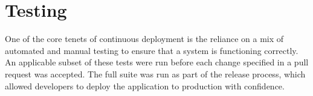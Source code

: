 \chapter{Testing}
\par
One of the core tenets of continuous deployment is the reliance on a mix of automated and manual testing to ensure that a system is functioning correctly. An applicable subset of these tests were run before each change specified in a pull request was accepted. The full suite was run as part of the release process, which allowed developers to deploy the application to production with confidence.










